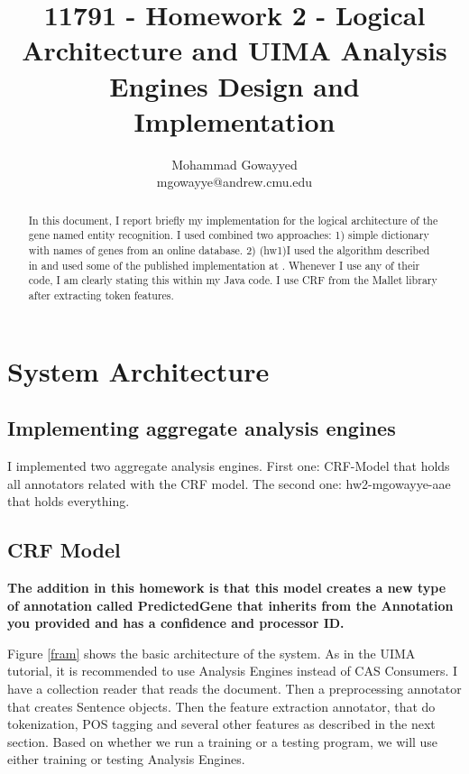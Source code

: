 \documentclass{article}
\begin{document}
\title{11791 - Homework 2 - Logical Architecture and UIMA Analysis Engines Design and Implementation}
\author{Mohammad Gowayyed \\ mgowayye@andrew.cmu.edu}

\maketitle
\begin{abstract}
In this document, I report briefly my implementation for the logical architecture of the gene named entity recognition. I used combined two approaches: 1) simple dictionary with names of genes from an online database. 2) (hw1)I used the algorithm described in \cite{banner} and used some of the published implementation at \cite{banner_code}. Whenever I use any of their code, I am clearly stating this within my Java code. I use CRF from the Mallet library after extracting token features.
\end{abstract}


\section{System Architecture}
\subsection{Implementing aggregate analysis engines}
I implemented two aggregate analysis engines. First one: CRF-Model that holds all annotators related with the CRF model. The second one: hw2-mgowayye-aae that holds everything.
\subsection{CRF Model}
\textbf{The addition in this homework is that this model creates a new type of annotation called PredictedGene that inherits from the Annotation you provided and has a confidence and processor ID.}

Figure \ref{fram} shows the basic architecture of the system. As in the UIMA tutorial, it is recommended to use Analysis Engines instead of CAS Consumers. I have a collection reader that reads the document. Then a preprocessing annotator that creates Sentence objects. Then the feature extraction annotator, that do tokenization, POS tagging and several other features as described in the next section. Based on whether we run a training or a testing program, we will use either training or testing Analysis Engines.\\
\end{document}
